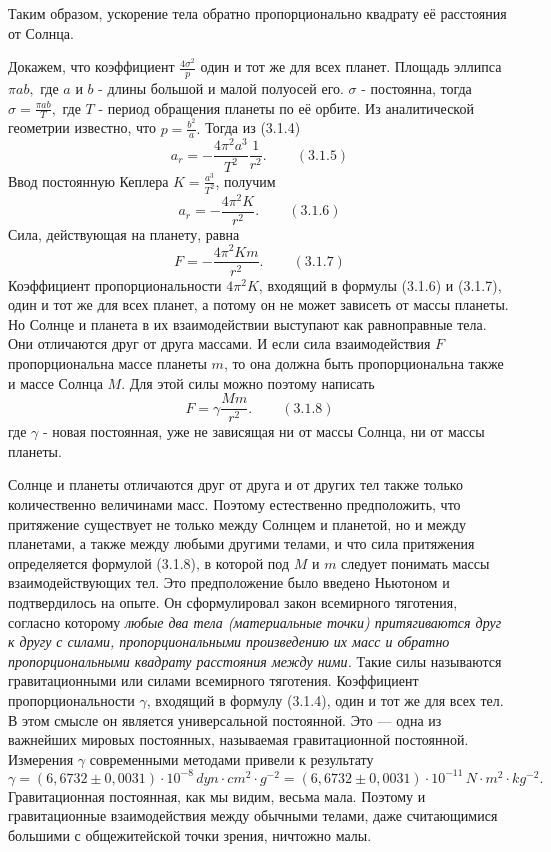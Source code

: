 \documentclass[a4paper,12pt]{article}
\begin{document}
Таким образом, ускорение тела обратно пропорционально квадрату её расстояния от Солнца.

Докажем, что коэффициент  $\frac{4\sigma^2}{p}$ один и тот же для всех планет. Площадь эллипса $\pi a b,$ где $a$ и $b$ - длины большой и малой полуосей его.
$\sigma$ - постоянна, тогда $\sigma = \frac{\pi a b}{T},$ где $T$ - период обращения планеты по её орбите. Из аналитической геометрии известно, что $p = \frac{b^2}{a}.$ 
Тогда из (3.1.4)
$$ a_r = -\frac{4\pi^2 a^3}{T^2} \frac{1}{r^2}. \hspace{25pt} (3.1.5)$$
Ввод постоянную Кеплера $K = \frac{a^3}{T^2}$, получим
$$ a_r = -\frac{4\pi^2 K}{r^2}. \hspace{25pt} (3.1.6)$$
Сила, действующая на планету, равна
$$ F = -\frac{4\pi^2 K m}{r^2}. \hspace{25pt} (3.1.7)$$
Коэффициент пропорциональности $4\pi^2 K$, входящий в формулы (3.1.6) и (3.1.7), один и тот же для всех планет, а потому он не может зависеть от массы планеты.
Но Солнце и планета в их взаимодействии выступают как равноправные тела.
Они отличаются друг от друга массами.
И если сила взаимодействия $F$ пропорциональна массе планеты $m$, то она должна быть пропорциональна также и массе Солнца $M$.
Для этой силы можно поэтому написать
$$ F = \gamma \frac{M m}{r^2}. \hspace{25pt} (3.1.8)$$
где $\gamma$ - новая постоянная, уже не зависящая ни от массы Солнца, ни от массы планеты.

Солнце и планеты отличаются друг от друга и от других тел также только количественно величинами масс.
Поэтому естественно предположить, что притяжение существует не только между Солнцем и планетой, но и между планетами,
а также между любыми другими телами, и что сила притяжения определяется формулой (3.1.8), в которой под $M$ и $m$ следует понимать массы взаимодействующих тел.
Это предположение было введено Ньютоном и подтвердилось на опыте. Он сформулировал закон всемирного тяготения,
согласно которому \textit{любые два тела (материальные точки) притягиваются друг к другу с силами,
пропорциональными произведению их масс и обратно пропорциональными квадрату расстояния между ними.}
Такие силы называются гравитационными или силами всемирного тяготения.
Коэффициент пропорциональности $\gamma$, входящий в формулу (3.1.4), один и тот же для всех тел.
В этом смысле он является универсальной постоянной. Это — одна из важнейших мировых постоянных, называемая гравитационной постоянной.
Измерения $\gamma$ современными методами привели к результату
$$ \gamma = (6,6732 \pm 0,0031) \cdot 10^{-8}  \hspace{2pt} dyn \cdot cm^{2} \cdot  g^{-2} 
          = (6,6732 \pm 0,0031) \cdot 10^{-11} \hspace{2pt}   N \cdot  m^{2} \cdot kg^{-2}.$$
Гравитационная постоянная, как мы видим, весьма мала.
Поэтому и гравитационные взаимодействия между обычными телами, даже считающимися большими с общежитейской точки зрения, ничтожно малы.
\end{document}
